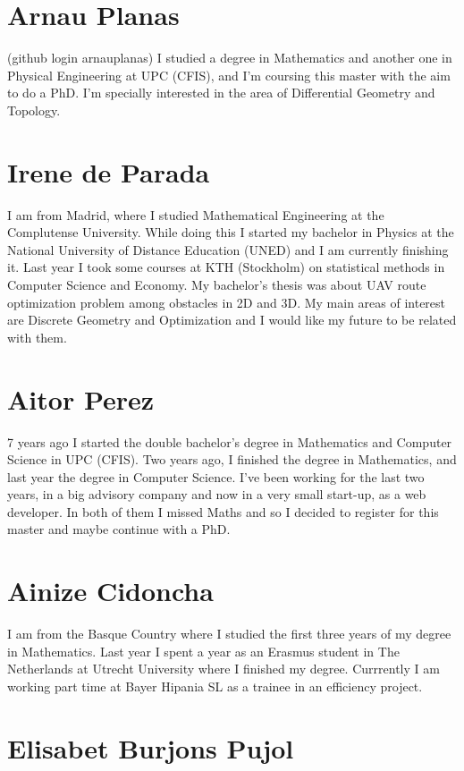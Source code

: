 \documentclass[11pt]{amsart}
\begin{document}
\section*{Arnau Planas}
(github login arnauplanas) I studied a degree in Mathematics and another one in Physical Engineering at UPC (CFIS), 
and I'm coursing this master with the aim to do a PhD. 
I'm specially interested in the area of Differential Geometry and Topology.
\medskip

\section*{Irene de Parada}

I am from Madrid, where I studied Mathematical Engineering at the Complutense University. While doing this I started my bachelor in Physics  at the National University of Distance Education (UNED) and I am currently finishing it. Last year I took some courses at KTH (Stockholm) on statistical methods in Computer Science and Economy. My  bachelor's thesis was about UAV route optimization problem  among obstacles in 2D and 3D. My main areas of interest are Discrete Geometry and Optimization and I would like my future to be related with them.

\section*{Aitor Perez}
7 years ago I started the double bachelor's degree in Mathematics and Computer Science in UPC (CFIS). Two years ago, I finished the degree in Mathematics, and last year the degree in Computer Science. I've been working for the last two years, in a big advisory company and now in a very small start-up, as a web developer. In both of them I missed Maths and so I decided to register for this master and maybe continue with a PhD.

\section*{Ainize Cidoncha}
I am from the Basque Country where I studied the first three years of my degree in Mathematics. Last year I spent a year as an Erasmus student in The Netherlands at Utrecht University where I finished my degree. 
Currrently I am working part time at Bayer Hipania SL as a trainee in an efficiency project.

\section*{Elisabet Burjons Pujol}
\end{document}
